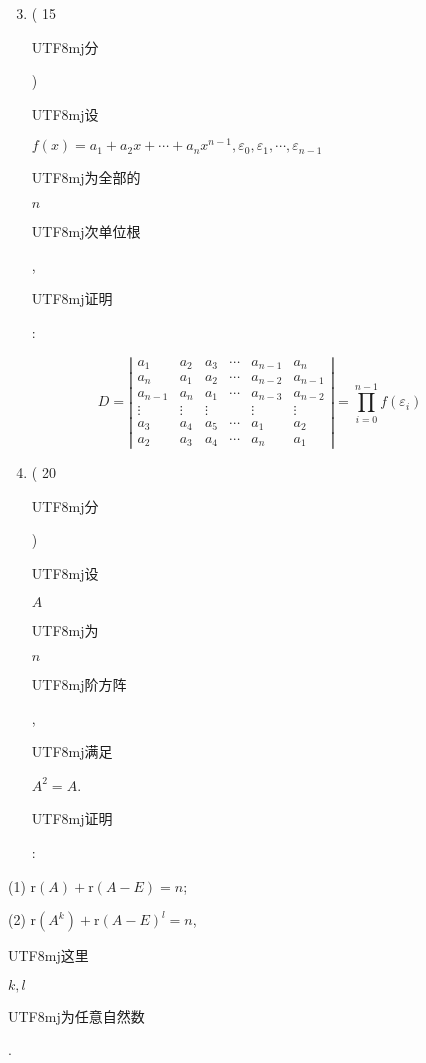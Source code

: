 \documentclass[10pt]{article}
\begin{document}
\begin{enumerate}
  \setcounter{enumi}{2}
  \item ( 15 \begin{CJK}{UTF8}{mj}分\end{CJK}) \begin{CJK}{UTF8}{mj}设\end{CJK} $f(x)=a_{1}+a_{2} x+\cdots+a_{n} x^{n-1}, \varepsilon_{0}, \varepsilon_{1}, \cdots, \varepsilon_{n-1}$ \begin{CJK}{UTF8}{mj}为全部的\end{CJK} $n$ \begin{CJK}{UTF8}{mj}次单位根\end{CJK}, \begin{CJK}{UTF8}{mj}证明\end{CJK}:
\end{enumerate}
$$
D=\left|\begin{array}{cccccc}
a_{1} & a_{2} & a_{3} & \cdots & a_{n-1} & a_{n} \\
a_{n} & a_{1} & a_{2} & \cdots & a_{n-2} & a_{n-1} \\
a_{n-1} & a_{n} & a_{1} & \cdots & a_{n-3} & a_{n-2} \\
\vdots & \vdots & \vdots & & \vdots & \vdots \\
a_{3} & a_{4} & a_{5} & \cdots & a_{1} & a_{2} \\
a_{2} & a_{3} & a_{4} & \cdots & a_{n} & a_{1}
\end{array}\right|=\prod_{i=0}^{n-1} f\left(\varepsilon_{i}\right)
$$

\begin{enumerate}
  \setcounter{enumi}{3}
  \item ( 20 \begin{CJK}{UTF8}{mj}分\end{CJK}) \begin{CJK}{UTF8}{mj}设\end{CJK} $A$ \begin{CJK}{UTF8}{mj}为\end{CJK} $n$ \begin{CJK}{UTF8}{mj}阶方阵\end{CJK}, \begin{CJK}{UTF8}{mj}满足\end{CJK} $A^{2}=A$. \begin{CJK}{UTF8}{mj}证明\end{CJK}:
\end{enumerate}
(1) $\mathrm{r}(A)+\mathrm{r}(A-E)=n$;

(2) $\mathrm{r}\left(A^{k}\right)+\mathrm{r}(A-E)^{l}=n$, \begin{CJK}{UTF8}{mj}这里\end{CJK} $k, l$ \begin{CJK}{UTF8}{mj}为任意自然数\end{CJK}.
\end{document}
